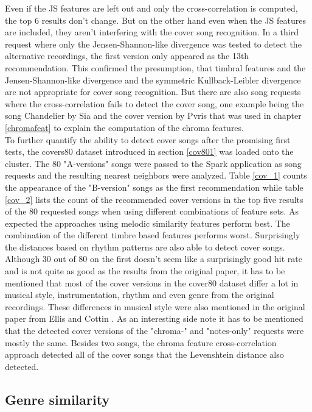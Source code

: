 \noindent Even if the JS features are left out and only the cross-correlation is computed, the top 6 results don't change. But on the other hand even when the JS features are included, they aren't interfering with the cover song recognition. In a third request where only the Jensen-Shannon-like divergence was tested to detect the alternative recordings, the first version only appeared as the 13th recommendation. This confirmed the presumption, that timbral features and the Jensen-Shannon-like divergence and the symmetric Kullback-Leibler divergence are not appropriate for cover song recognition.
\noindent But there are also song requests where the cross-correlation fails to detect the cover song, one example being the song Chandelier by Sia and the cover version by Pvris that was used in chapter \ref{chromafeat} to explain the computation of the chroma features.\\
\noindent To further quantify the ability to detect cover songs after the promising first tests, the covers80 dataset introduced in section \ref{cov801} was loaded onto the cluster. The 80 "A-versions" songs were passed to the Spark application as song requests and the resulting nearest neighbors were analyzed. Table \ref{cov_1} counts the appearance of the "B-version" songs as the first recommendation while table \ref{cov_2} lists the count of the recommended cover versions in the top five results of the 80 requested songs when using different combinations of feature sets. As expected the approaches using melodic similarity features perform best. The combination of the different timbre based features performs worst. Surprisingly the distances based on rhythm patterns are also able to detect cover songs.\\
\noindent Although 30 out of 80 on the first doesn't seem like a surprisingly good hit rate and is not quite as good as the results from the original paper, it has to be mentioned that most of the cover versions in the cover80 dataset differ a lot in musical style, instrumentation, rhythm and even genre from the original recordings. These differences in musical style were also mentioned in the original paper from Ellis and Cottin \cite[p. 3]{cover802}.
\noindent As an interesting side note it has to be mentioned that the detected cover versions of the "chroma-" and "notes-only" requests were mostly the same. Besides two songs, the chroma feature cross-correlation approach detected all of the cover songs that the Levenshtein distance also detected. 

\subsection{Genre similarity}\label{genrerec}

